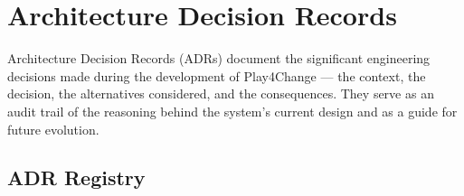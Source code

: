 %
%
\chapter{Architecture Decision Records}
\label{app:adrs}

Architecture Decision Records (ADRs) document the significant engineering decisions made during the development of Play4Change — the context, the decision, the alternatives considered, and the consequences. They serve as an audit trail of the reasoning behind the system's current design and as a guide for future evolution.

\section{ADR Registry}
\label{app:adr_registry}

